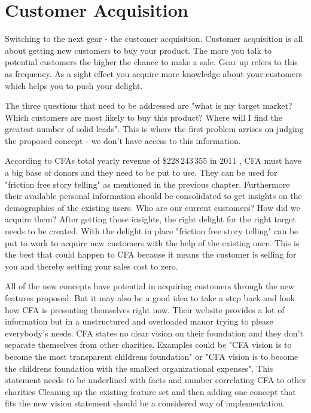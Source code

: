 \section{Customer Acquisition}

Switching to the next gear - the customer acquisition. Customer acquisition is all about getting new customers to buy your product. The more you talk to potential customers the higher the chance to make a sale. Gear up refers to this as frequency. As a sight effect you acquire more knowledge about your customers which helps you to push your delight.

The three questions that need to be addressed are "what is my target market? Which customers are most likely to buy this product? Where will I find the greatest number of solid leads"\cite{Ramfelt}. This is where the first problem arrises on judging the proposed concept - we don't have access to this information. 

According to CFAs total yearly revenue of  \$228\,243\,355 in 2011 \cite{Charity}, CFA must have a big base of donors and they need to be put to use. They can be used for "friction free story telling" as mentioned in the previous chapter. Furthermore their available personal information should be consolidated to get insights on the demographics of the existing users. Who are our current customers? How did we acquire them? After getting those insights, the right delight for the right target needs to be created. With the delight in place "friction free story telling" can be put to work to acquire new customers with the help of the existing once. This is the best that could happen to CFA because it means the customer is selling for you and thereby setting your sales cost to zero.


All of the new concepts have potential in acquiring customers through the new features proposed. But it may also be a good idea to take a step back and look how CFA is presenting themselves right now. Their website provides a lot of information but in a unstructured and overloaded manor trying to please everybody's needs. CFA states no clear vision on their foundation and they don't separate themselves from other charities. Examples could be "CFA vision is to become the most transparent childrens foundation" or "CFA vision is to become the childrens foundation with the smallest organizational expenses". This statement needs to be underlined with facts and number correlating CFA to other charities Cleaning up the existing feature set and then adding one concept that fits the new vision statement should be a considered way of implementation.



